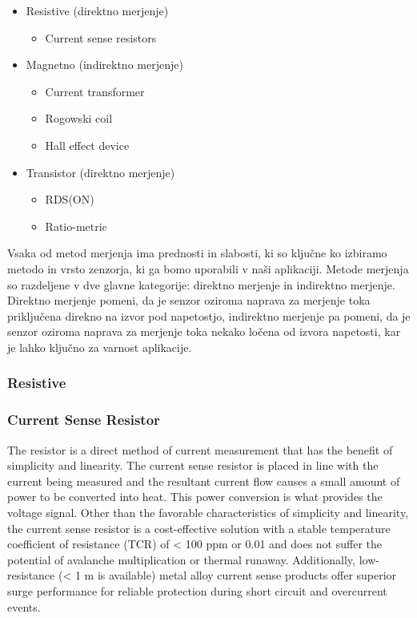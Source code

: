 \documentclass[12pt,a4paper,titlepage,openany]{report}
\begin{document}
\begin{itemize}
\item Resistive (direktno merjenje)

\begin{itemize}
\item Current sense resistors
\end{itemize}

 \item Magnetno (indirektno merjenje)

\begin{itemize}
\item Current transformer
\item Rogowski coil
\item Hall effect device
\end{itemize}

\item Transistor (direktno merjenje)

\begin{itemize}
\item RDS(ON)
\item Ratio-metric
\end{itemize}

\end{itemize}

Vsaka od metod merjenja ima prednosti in slabosti, ki so ključne ko izbiramo metodo in vrsto zenzorja, ki ga bomo uporabili
v naši aplikaciji. Metode merjenja so razdeljene v dve glavne kategorije: direktno merjenje in indirektno merjenje.
Direktno merjenje pomeni, da je senzor oziroma naprava za merjenje toka priključena direkno na izvor pod napetostjo, 
indirektno merjenje pa pomeni, da je senzor oziroma naprava za merjenje toka nekako ločena od izvora napetosti, 
kar je lahko ključno za varnost aplikacije.

\subsubsection{Resistive}
\subsubsection{Current Sense Resistor}
The resistor is a direct method of current measurement that has the benefit of simplicity and linearity. The current sense resistor
is placed in line with the current being measured and the resultant current flow causes a small amount of power to be converted
into heat. This power conversion is what provides the voltage signal. Other than the favorable characteristics of simplicity and
linearity, the current sense resistor is a cost-effective solution with a stable temperature coefficient of resistance (TCR) of
< 100 ppm or 0.01  and does not suffer the potential of avalanche multiplication or thermal runaway. Additionally,
low-resistance (< 1 m is available) metal alloy current sense products offer superior surge performance for reliable protection
during short circuit and overcurrent events.
\end{document}
